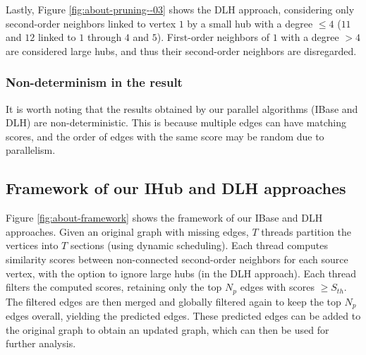 Lastly, Figure \ref{fig:about-pruning--03} shows the DLH approach, considering only second-order neighbors linked to vertex $1$ by a small hub with a degree $\leq 4$ ($11$ and $12$ linked to $1$ through $4$ and $5$). First-order neighbors of $1$ with a degree $> 4$ are considered large hubs, and thus their second-order neighbors are disregarded.




\subsubsection{Non-determinism in the result}

It is worth noting that the results obtained by our parallel algorithms (IBase and DLH) are non-deterministic. This is because multiple edges can have matching scores, and the order of edges with the same score may be random due to parallelism.




\subsection{Framework of our IHub and DLH approaches}

Figure \ref{fig:about-framework} shows the framework of our IBase and DLH approaches. Given an original graph with missing edges, $T$ threads partition the vertices into $T$ sections (using dynamic scheduling). Each thread computes similarity scores between non-connected second-order neighbors for each source vertex, with the option to ignore large hubs (in the DLH approach). Each thread filters the computed scores, retaining only the top $N_p$ edges with scores $\geq S_{th}$. The filtered edges are then merged and globally filtered again to keep the top $N_p$ edges overall, yielding the predicted edges. These predicted edges can be added to the original graph to obtain an updated graph, which can then be used for further analysis.






